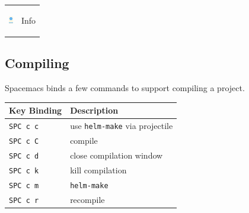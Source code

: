 \documentclass[11pt]{article}
\begin{document}
\begin{center}
\begin{tabular}{ll}
\begin{center}
\includegraphics[width=.9\linewidth]{img/dot-info.png}
\end{center} & Info\\
\end{tabular}
\end{center}

\subsection{Compiling}
\label{sec:orgd801d14}
Spacemacs binds a few commands to support compiling a project.

\begin{center}
\begin{tabular}{ll}
Key Binding & Description\\
\hline
\texttt{SPC c c} & use \texttt{helm-make} via projectile\\
\texttt{SPC c C} & compile\\
\texttt{SPC c d} & close compilation window\\
\texttt{SPC c k} & kill compilation\\
\texttt{SPC c m} & \texttt{helm-make}\\
\texttt{SPC c r} & recompile\\
\end{tabular}
\end{center}
\end{document}
